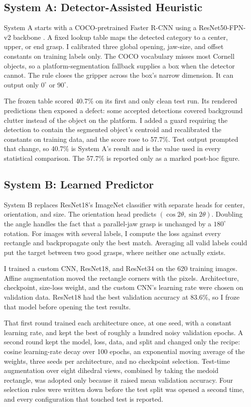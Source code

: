 \documentclass[10pt,conference,compsoc]{IEEEtran}
\begin{document}
\subsection{System A: Detector-Assisted Heuristic}
\label{sec:systema}

System A starts with a COCO-pretrained Faster R-CNN using a
ResNet50-FPN-v2 backbone \cite{ren2015}. A fixed lookup table maps the detected
category to a center, upper, or end grasp. I calibrated three global
opening, jaw-size, and offset constants on training labels only. The COCO
vocabulary misses most Cornell objects, so a platform-segmentation fallback
supplies a box when the detector cannot. The rule closes the gripper across
the box's narrow dimension. It can output only $0^\circ$ or $90^\circ$.

The frozen table scored 40.7\% on its first and only clean test run. Its
rendered predictions then exposed a defect: some accepted detections covered
background clutter instead of the object on the platform. I added a guard
requiring the detection to contain the segmented object's centroid and
recalibrated the constants on training data, and the score rose to 57.7\%.
Test output prompted that change, so 40.7\% is System A's result and is the
value used in every statistical comparison. The 57.7\% is reported only as a
marked post-hoc figure.

\subsection{System B: Learned Predictor}

System B replaces ResNet18's ImageNet classifier \cite{he2016} with separate
heads for center, orientation, and size. The orientation head predicts
$(\cos 2\theta,\sin 2\theta)$. Doubling the angle handles the fact that a
parallel-jaw grasp is unchanged by a $180^\circ$ rotation. For images with
several labels, I compute the loss against every rectangle and backpropagate
only the best match. Averaging all valid labels could put the target between
two good grasps, where neither one actually exists.

I trained a custom CNN, ResNet18, and ResNet34 on the 620 training images.
Affine augmentation moved the rectangle corners with the pixels. Architecture,
checkpoint, size-loss weight, and the custom CNN's learning rate were chosen
on validation data. ResNet18 had the best validation accuracy at 83.6\%, so I
froze that model before opening the test results.

That first round trained each architecture once, at one seed, with a
constant learning rate, and kept the best of roughly a hundred noisy
validation epochs. A second round kept the model, loss, data, and split and
changed only the recipe: cosine learning-rate decay over 100 epochs, an
exponential moving average of the weights, three seeds per architecture, and
no checkpoint selection. Test-time augmentation over eight dihedral views,
combined by taking the medoid rectangle, was adopted only because it raised
mean validation accuracy. Four selection rules were written down before the
test split was opened a second time, and every configuration that touched
test is reported.
\end{document}

